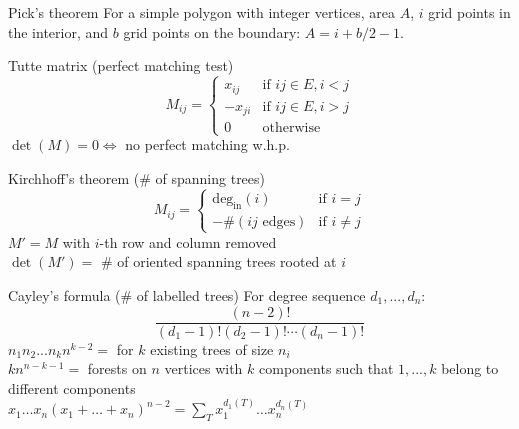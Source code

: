 
\begin{misc}{Pick's theorem}
	For a simple polygon with integer vertices, area $A$, $i$ grid points in the interior, and $b$ grid points on the boundary:
	$A=i+b/2-1$.
\end{misc}

\begin{misc}{Tutte matrix (perfect matching test)}
	\begin{equation*}
		M_{ij} =
			\begin{cases}
				x_{ij} & \text{if } ij \in E, i < j \\
				-x_{ji} & \text{if } ij \in E, i > j \\
				0 & \text{otherwise}
			\end{cases}
	\end{equation*}
	$\det(M) = 0 \iff $ no perfect matching w.h.p. \\
\end{misc}

\begin{misc}{Kirchhoff's theorem (\# of spanning trees)}
	\begin{equation*}
		M_{ij} =
			\begin{cases}
				\text{deg}_{\text{in}}(i) & \text{if } i = j \\
				-\#(ij\text{ edges}) & \text{if } i \neq j
			\end{cases}
	\end{equation*}
	$M' = M$ with $i$-th row and column removed \\
	$\det(M') = $ \# of oriented spanning trees rooted at $i$
\end{misc}

\begin{misc}{Cayley's formula (\# of labelled trees)}
	For degree sequence $d_1, ..., d_n$:
	\begin{equation*}
		\frac{(n-2)!}{(d_1 - 1)!(d_2 - 1)! \cdots (d_n - 1)!}
	\end{equation*}
	$n_1n_2...n_kn^{k-2} =$ for $k$ existing trees of size $n_i$ \\
	$kn^{n-k-1} =$ forests on $n$ vertices with $k$ components such that $1, ..., k$ belong to different components \\
	$x_1 \ldots x_n(x_1+ \ldots +x_n)^{n-2} = \sum_T x_1^{d_1(T)} \ldots x_n^{d_n(T)}$
\end{misc}

